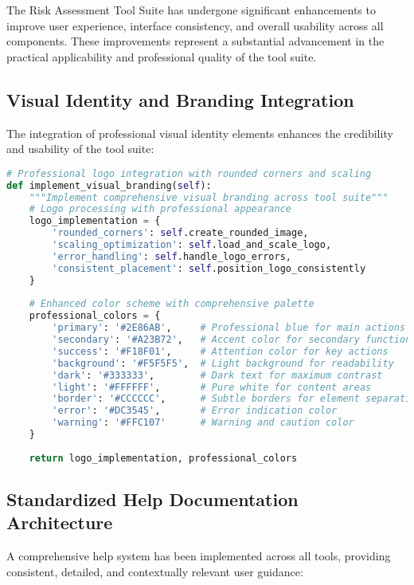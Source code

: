 \documentclass[binding=0.6cm]{sapthesis}
\begin{document}
The Risk Assessment Tool Suite has undergone significant enhancements to improve user experience, interface consistency, and overall usability across all components. These improvements represent a substantial advancement in the practical applicability and professional quality of the tool suite.

\subsection{Visual Identity and Branding Integration}

The integration of professional visual identity elements enhances the credibility and usability of the tool suite:

\begin{lstlisting}[language=Python, caption=Logo Integration and Professional Branding]
# Professional logo integration with rounded corners and scaling
def implement_visual_branding(self):
    """Implement comprehensive visual branding across tool suite"""
    # Logo processing with professional appearance
    logo_implementation = {
        'rounded_corners': self.create_rounded_image,
        'scaling_optimization': self.load_and_scale_logo,
        'error_handling': self.handle_logo_errors,
        'consistent_placement': self.position_logo_consistently
    }
    
    # Enhanced color scheme with comprehensive palette
    professional_colors = {
        'primary': '#2E86AB',     # Professional blue for main actions
        'secondary': '#A23B72',   # Accent color for secondary functions
        'success': '#F18F01',     # Attention color for key actions
        'background': '#F5F5F5',  # Light background for readability
        'dark': '#333333',        # Dark text for maximum contrast
        'light': '#FFFFFF',       # Pure white for content areas
        'border': '#CCCCCC',      # Subtle borders for element separation
        'error': '#DC3545',       # Error indication color
        'warning': '#FFC107'      # Warning and caution color
    }
    
    return logo_implementation, professional_colors
\end{lstlisting}

\subsection{Standardized Help Documentation Architecture}

A comprehensive help system has been implemented across all tools, providing consistent, detailed, and contextually relevant user guidance:
\end{document}
